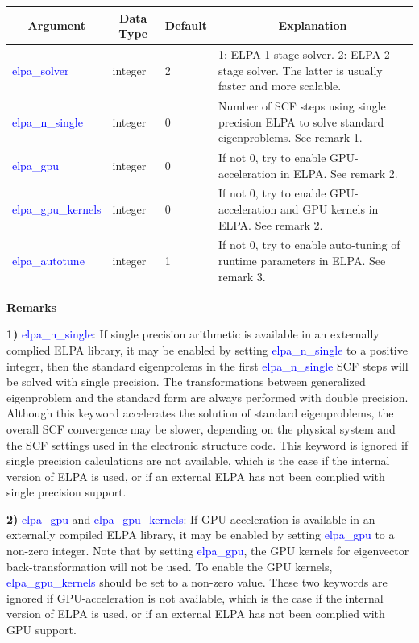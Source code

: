 \documentclass{report}
\begin{document}
\begin{tabular}[]{|p{30mm}|p{20mm}|p{15mm}|p{100mm}|}
\hline
\multicolumn{1}{|c|}{\textbf{Argument}} & \multicolumn{1}{c|}{\textbf{Data Type}} & \multicolumn{1}{c|}{\textbf{Default}} & \multicolumn{1}{c|}{\textbf{Explanation}}\\
\hline
\textcolor{blue}{elpa\_solver}       & integer & 2 & 1:  ELPA 1-stage solver.  2:  ELPA 2-stage solver.  The latter is usually faster and more scalable.\\
\hline
\textcolor{blue}{elpa\_n\_single}    & integer & 0 & Number of SCF steps using single precision ELPA to solve standard eigenproblems.  See remark 1.\\
\hline
\textcolor{blue}{elpa\_gpu}          & integer & 0 & If not 0, try to enable GPU-acceleration in ELPA.  See remark 2.\\
\hline
\textcolor{blue}{elpa\_gpu\_kernels} & integer & 0 & If not 0, try to enable GPU-acceleration and GPU kernels in ELPA.  See remark 2.\\
\hline
\textcolor{blue}{elpa\_autotune}     & integer & 1 & If not 0, try to enable auto-tuning of runtime parameters in ELPA.  See remark 3.\\
\hline
\end{tabular}

\textbf{Remarks}

\textbf{1)} \textcolor{blue}{elpa\_n\_single}:  If single precision arithmetic is available in an externally complied ELPA library, it may be enabled by setting \textcolor{blue}{elpa\_n\_single} to a positive integer, then the standard eigenprolems in the first \textcolor{blue}{elpa\_n\_single} SCF steps will be solved with single precision.  The transformations between generalized eigenproblem and the standard form are always performed with double precision.  Although this keyword accelerates the solution of standard eigenproblems, the overall SCF convergence may be slower, depending on the physical system and the SCF settings used in the electronic structure code.  This keyword is ignored if single precision calculations are not available, which is the case if the internal version of ELPA is used, or if an external ELPA has not been complied with single precision support.

\textbf{2)} \textcolor{blue}{elpa\_gpu} and \textcolor{blue}{elpa\_gpu\_kernels}:  If GPU-acceleration is available in an externally compiled ELPA library, it may be enabled by setting \textcolor{blue}{elpa\_gpu} to a non-zero integer.  Note that by setting \textcolor{blue}{elpa\_gpu}, the GPU kernels for eigenvector back-transformation will not be used.  To enable the GPU kernels, \textcolor{blue}{elpa\_gpu\_kernels} should be set to a non-zero value.  These two keywords are ignored if GPU-acceleration is not available, which is the case if the internal version of ELPA is used, or if an external ELPA has not been complied with GPU support.
\end{document}
